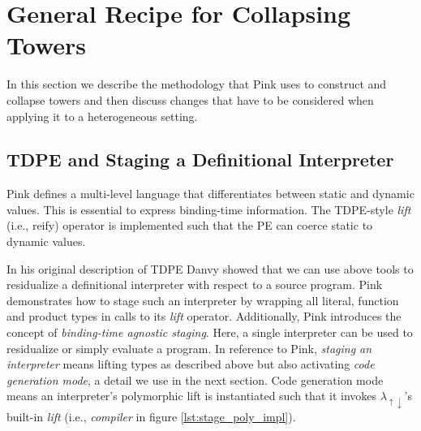 \documentclass[a4paper,12pt,twoside,openright]{report}
\theoremstyle{definition}
\newcommand{\mslang}{$\lambda_{\uparrow\downarrow}$}
\begin{document}
\section{General Recipe for Collapsing Towers}\label{sec:recipe}
In this section we describe the methodology that Pink uses to construct and collapse towers and then discuss changes that have to be considered when applying it to a heterogeneous setting.

\subsection{TDPE and Staging a Definitional Interpreter}\label{subsec:stage_def_interp}
Pink defines a multi-level language that differentiates between static and dynamic values. This is essential to express binding-time information. The TDPE-style \textit{lift} (i.e., reify) operator is implemented such that the PE can coerce static to dynamic values.

In his original description of TDPE  Danvy \cite{danvy1999type} showed that we can use above tools to residualize a definitional interpreter with respect to a source program. Pink demonstrates how to stage such an interpreter by wrapping all literal, function and product types in calls to its \textit{lift} operator. Additionally, Pink introduces the concept of \textit{binding-time agnostic staging}. Here, a single interpreter can be used to residualize or simply evaluate a program. In reference to Pink, \textit{staging an interpreter} means lifting types as described above but also activating \textit{code generation mode}, a detail we use in the next section. Code generation mode means an interpreter's polymorphic lift is instantiated such that it invokes \mslang's built-in \textit{lift} (i.e., \textit{compiler} in figure \ref{lst:stage_poly_impl}).
\end{document}
